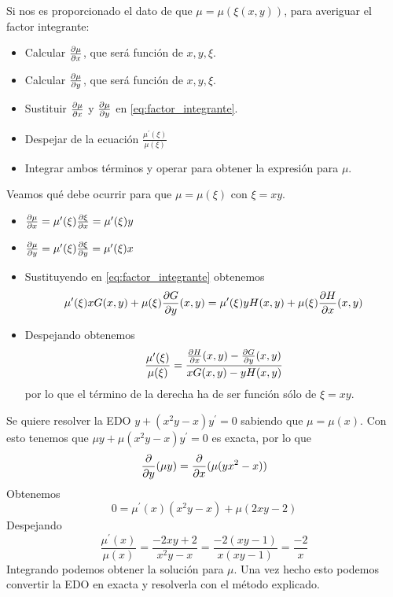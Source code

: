 \begin{method}
Si nos es proporcionado el dato de que $\mu = \mu(\xi(x,y))$, para averiguar el factor integrante:
\begin{itemize}
\item Calcular $\partialder{x}{\mu}$, que será función de $x,y,\xi$.
\item Calcular $\partialder{y}{\mu}$, que será función de $x,y,\xi$.
\item Sustituir $\partialder{x}{\mu}$ y $\partialder{y}{\mu}$ en \ref{eq:factor_integrante}.
\item Despejar de la ecuación $\frac{\mu^\prime(\xi)}{\mu(\xi)}$
\item Integrar ambos términos y operar para obtener la expresión para $\mu$.
\end{itemize}
\end{method}

\begin{example}
Veamos qué debe ocurrir para que $\mu = \mu(\xi)$ con $\xi = xy$.
\begin{itemize}
\item $\partialder{x}{\mu} = \mu^\prime(\xi)\partialder{x}{\xi} = \mu^\prime(\xi)y$
\item $\partialder{y}{\mu} = \mu^\prime(\xi)\partialder{y}{\xi} = \mu^\prime(\xi)x$
\item Sustituyendo en \ref{eq:factor_integrante} obtenemos $$\mu^\prime(\xi)xG(x,y)+\mu(\xi)\partialder{y}{G}(x,y) = \mu^\prime(\xi)yH(x,y)+\mu(\xi)\partialder{x}{H}(x,y)$$
\item Despejando obtenemos $$\frac{\mu^\prime(\xi)}{\mu(\xi)} = \frac{\partialder{x}{H}(x,y)-\partialder{y}{G}(x,y)}{xG(x,y)-yH(x,y)}$$ por lo que el término de la derecha ha de ser función sólo de $\xi=xy$.
\end{itemize}
\end{example}

\begin{example}
Se quiere resolver la EDO $y+(x^2y-x)y^\prime = 0$ sabiendo que $\mu = \mu(x)$. Con esto tenemos que $\mu y +\mu(x^2y-x)y^\prime = 0$ es exacta, por lo que $$\derivative{y}(\mu y) = \derivative{x} (\mu(yx^2-x))$$
Obtenemos $$0 = \mu^\prime(x)(x^2y-x)+\mu(2xy-2)$$
Despejando $$\frac{\mu^\prime(x)}{\mu(x)} = \frac{-2xy+2}{x^2y-x} = \frac{-2(xy-1)}{x(xy-1)} = \frac{-2}{x}$$
Integrando podemos obtener la solución para $\mu$. Una vez hecho esto podemos convertir la EDO en exacta y resolverla con el método explicado.
\end{example}

